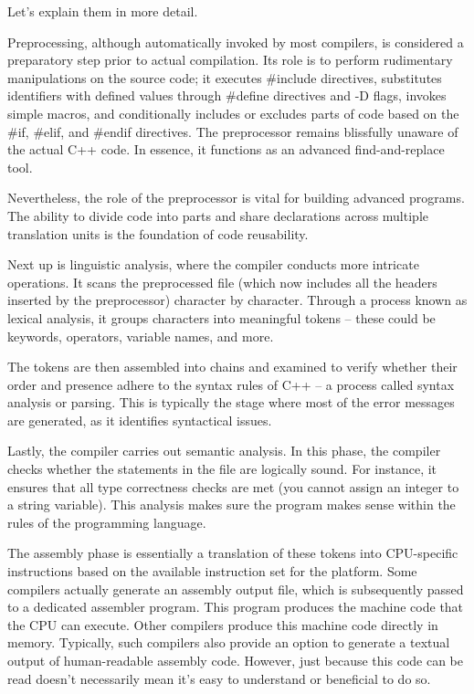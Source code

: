 Let’s explain them in more detail.

Preprocessing, although automatically invoked by most compilers, is considered a preparatory step prior to actual compilation. Its role is to perform rudimentary manipulations on the source code; it executes \#include directives, substitutes identifiers with defined values through \#define directives and -D flags, invokes simple macros, and conditionally includes or excludes parts of code based on the \#if, \#elif, and \#endif directives. The preprocessor remains blissfully unaware of the actual C++ code. In essence, it functions as an advanced find-and-replace tool.

Nevertheless, the role of the preprocessor is vital for building advanced programs. The ability to divide code into parts and share declarations across multiple translation units is the foundation of code reusability.

Next up is linguistic analysis, where the compiler conducts more intricate operations. It scans the preprocessed file (which now includes all the headers inserted by the preprocessor) character by character. Through a process known as lexical analysis, it groups characters into meaningful tokens – these could be keywords, operators, variable names, and more.

The tokens are then assembled into chains and examined to verify whether their order and presence adhere to the syntax rules of C++ – a process called syntax analysis or parsing. This is typically the stage where most of the error messages are generated, as it identifies syntactical issues.

Lastly, the compiler carries out semantic analysis. In this phase, the compiler checks whether the statements in the file are logically sound. For instance, it ensures that all type correctness checks are met (you cannot assign an integer to a string variable). This analysis makes sure the program makes sense within the rules of the programming language.

The assembly phase is essentially a translation of these tokens into CPU-specific instructions based on the available instruction set for the platform. Some compilers actually generate an assembly output file, which is subsequently passed to a dedicated assembler program. This program produces the machine code that the CPU can execute. Other compilers produce this machine code directly in memory. Typically, such compilers also provide an option to generate a textual output of human-readable assembly code. However, just because this code can be read doesn’t necessarily mean it’s easy to understand or beneficial to do so.

